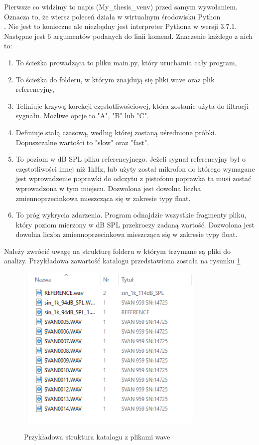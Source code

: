 \documentclass[eng,printmode]{mgr}
\begin{document}
Pierwsze co widzimy to napis (My\_thesis\_venv) przed samym wywołaniem. Oznacza to, że wiersz poleceń działa w wirtualnym środowisku Python \\ \cite{venv}. Nie jest to konieczne ale niezbędny jest interpreter Pythona w wersji 3.7.1. Następne jest 6 argumentów podanych do linii komend. Znaczenie każdego z nich to:

\begin{minipage}{\linewidth}
\begin{enumerate}
\item To ścieżka prowadząca to pliku main.py, który uruchamia cały program,
\item To ścieżka do folderu, w którym znajdują się pliki wave oraz plik referencyjny,
\item Tefiniuje krzywą korekcji częstotliwościowej, która zostanie użyta do filtracji sygnału. Możliwe opcje to "A", "B" lub "C".
\item Definiuje stałą czasową, według której zostaną uśrednione próbki. Dopuszczalne wartości to "slow" oraz "fast".
\item To poziom w dB SPL pliku referencyjnego. Jeżeli sygnał referencyjny był o częstotliwości innej niż 1kHz, lub użyty został mikrofon do którego wymagane jest wprowadzenie poprawki do odczytu z pistofonu poprawka ta musi zostać wprowadzona w tym miejscu. Dozwolona jest dowolna liczba zmiennoprzecinkowa mieszcząca się w zakresie typy float.
\item To próg wykrycia zdarzenia. Program odnajdzie wszystkie fragmenty pliku, który poziom mierzony w dB SPL przekroczy zadaną wartość. Dozwolona jest dowolna liczba zmiennoprzecinkowa mieszcząca się w zakresie typy float.
\end{enumerate}
\end{minipage}   

Należy zwrócić uwagę na strukturę folderu w którym trzymane są pliki do analizy. Przykładowa zawartość katalogu przedstawiona została na rysunku \ref{katalog}

\begin{figure}[hbtp]
\caption{Przykładowa struktura katalogu z plikami wave}
\centering
\includegraphics[width=0.8\textwidth]{katalog_przyklad.PNG}
\label{katalog}
\end{figure}
\end{document}
